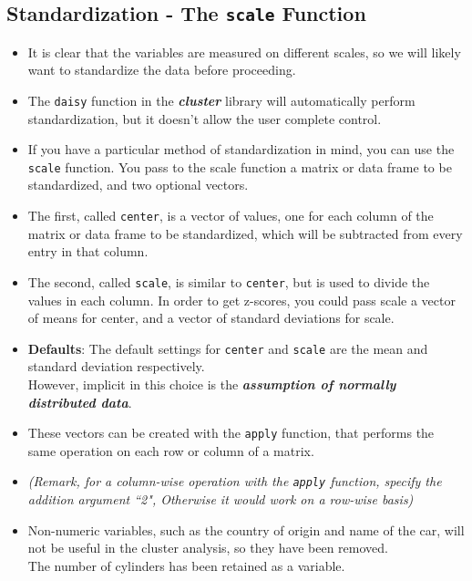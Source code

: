 \documentclass[12pt]{article}
\begin{document}
\subsection{Standardization - The \texttt{scale} Function}
\begin{itemize}
\item It is clear that the variables are measured on different scales, so we will likely want to standardize the data before proceeding. 
\item The \texttt{daisy} function in the \textbf{\textit{cluster}} library will automatically perform standardization, but it doesn't allow the user complete control. 
\bigskip

\item If you have a particular method of standardization in mind, you can use the \texttt{scale} function. You pass to the scale function a matrix or data frame to be standardized, and two optional vectors. 
\item The first, called \texttt{center}, is a vector of values, one for each column of the matrix or data frame to be standardized, which will be subtracted from every entry in that column. 
\item The second, called \texttt{scale}, is similar to \texttt{center}, but is used to divide the values in each column. In order to get z-scores, you could pass scale a vector of means for center, and a vector of standard deviations for scale.

\item \textbf{Defaults}: The default settings for \texttt{center} and \texttt{scale} are the mean and standard deviation respectively. \\ However, implicit in this choice is the \textbf{\textit{assumption of normally distributed data}}.
 
\item These vectors can be created with the \texttt{apply} function, that performs the same operation on each row or column of a matrix.\\ 
\item 
\textit{(Remark, for a column-wise operation with the \texttt{apply} function, specify the addition argument ``2", Otherwise it would work on a row-wise basis)}
\item Non-numeric variables, such as the country of origin and name of the car, will not be useful in the cluster analysis, so they have been removed. \\ The number of cylinders has been retained as a variable.
\end{itemize}
\end{document}
